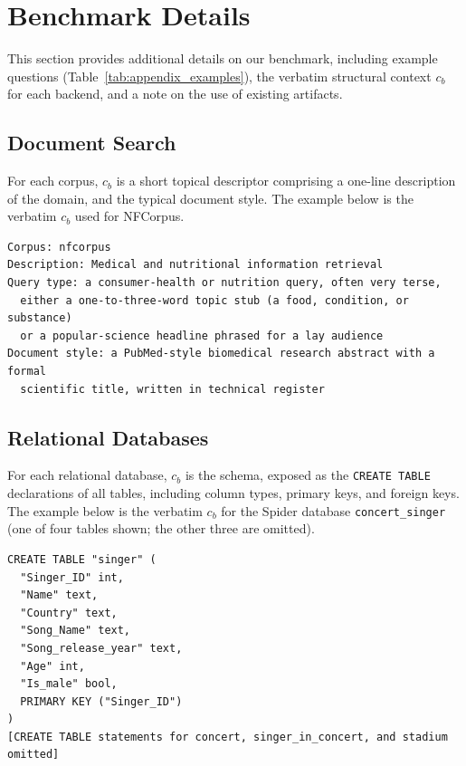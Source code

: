 
\section{Benchmark Details}
\label{sec:appendix_context}

This section provides additional details on our benchmark, including example questions (Table~\ref{tab:appendix_examples}), the verbatim structural context $c_b$ for each backend, and a note on the use of existing artifacts.



\subsection{Document Search}
\label{sec:appendix_context_search}
For each corpus, $c_b$ is a short topical descriptor comprising a one-line description of the domain, and the typical document style. The example below is the verbatim $c_b$ used for NFCorpus.

\begin{tcolorbox}[colback=gray!5, colframe=gray!50, boxrule=0.5pt, arc=2mm, left=4pt, right=4pt, top=3pt, bottom=3pt]
{\footnotesize
\begin{verbatim}
Corpus: nfcorpus
Description: Medical and nutritional information retrieval
Query type: a consumer-health or nutrition query, often very terse,
  either a one-to-three-word topic stub (a food, condition, or substance)
  or a popular-science headline phrased for a lay audience
Document style: a PubMed-style biomedical research abstract with a formal
  scientific title, written in technical register
\end{verbatim}
}
\end{tcolorbox}

\subsection{Relational Databases}
\label{sec:appendix_context_sql}
For each relational database, $c_b$ is the schema, exposed as the \texttt{CREATE TABLE} declarations of all tables, including column types, primary keys, and foreign keys. The example below is the verbatim $c_b$ for the Spider database \texttt{concert\_singer} (one of four tables shown; the other three are omitted).

\begin{tcolorbox}[colback=gray!5, colframe=gray!50, boxrule=0.5pt, arc=2mm, left=4pt, right=4pt, top=3pt, bottom=3pt]
{\footnotesize
\begin{verbatim}
CREATE TABLE "singer" (
  "Singer_ID" int,
  "Name" text,
  "Country" text,
  "Song_Name" text,
  "Song_release_year" text,
  "Age" int,
  "Is_male" bool,
  PRIMARY KEY ("Singer_ID")
)
[CREATE TABLE statements for concert, singer_in_concert, and stadium omitted]
\end{verbatim}
}
\end{tcolorbox}

